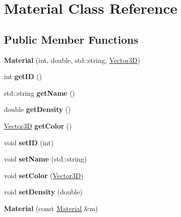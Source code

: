 \hypertarget{class_material}{}\section{Material Class Reference}
\label{class_material}
\subsection*{Public Member Functions}
\begin{DoxyCompactItemize}
\item 
{\bfseries Material} (int, double, std\+::string, \hyperlink{class_vector3_d}{Vector3D})\hypertarget{class_material_adbb4e5a1a288f3a8b01296b620bbecd3}{}\label{class_material_adbb4e5a1a288f3a8b01296b620bbecd3}

\item 
int {\bfseries get\+ID} ()\hypertarget{class_material_ad31f04334fa5bc9ff16170149f037f2a}{}\label{class_material_ad31f04334fa5bc9ff16170149f037f2a}

\item 
std\+::string {\bfseries get\+Name} ()\hypertarget{class_material_a6dd6278a55af611612d999c7d3ab63f3}{}\label{class_material_a6dd6278a55af611612d999c7d3ab63f3}

\item 
double {\bfseries get\+Density} ()\hypertarget{class_material_a3601b084de60ca17f7deda89567a2a7f}{}\label{class_material_a3601b084de60ca17f7deda89567a2a7f}

\item 
\hyperlink{class_vector3_d}{Vector3D} {\bfseries get\+Color} ()\hypertarget{class_material_acf6f174b41cddbe6d8f21d11525f6f7b}{}\label{class_material_acf6f174b41cddbe6d8f21d11525f6f7b}

\item 
void {\bfseries set\+ID} (int)\hypertarget{class_material_a219ae8a9fd2ff596d28625cfb8b2b317}{}\label{class_material_a219ae8a9fd2ff596d28625cfb8b2b317}

\item 
void {\bfseries set\+Name} (std\+::string)\hypertarget{class_material_a0a0580361765d0f3c21df7f21af7981c}{}\label{class_material_a0a0580361765d0f3c21df7f21af7981c}

\item 
void {\bfseries set\+Color} (\hyperlink{class_vector3_d}{Vector3D})\hypertarget{class_material_afa395703d77b04187d6373ad330824d9}{}\label{class_material_afa395703d77b04187d6373ad330824d9}

\item 
void {\bfseries set\+Density} (double)\hypertarget{class_material_afd9ed546e6a1b4ea948f331a455fe3b6}{}\label{class_material_afd9ed546e6a1b4ea948f331a455fe3b6}

\item 
{\bfseries Material} (const \hyperlink{class_material}{Material} \&m)\hypertarget{class_material_a65005757f3572b988460eff5544e9527}{}\label{class_material_a65005757f3572b988460eff5544e9527}

\end{DoxyCompactItemize}


